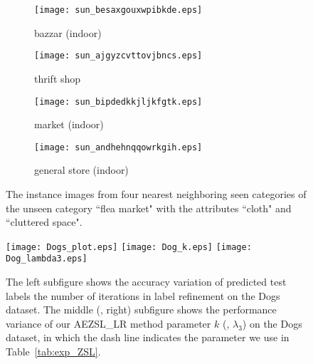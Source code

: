 \documentclass[journal]{IEEEtran}
\begin{document}
\setlength{\textfloatsep}{5pt}
\begin{figure*}[t]
        \centering
        \begin{subfigure}[b]{0.2985\textwidth}
                \texttt{[image: sun\_besaxgouxwpibkde.eps]}
				\caption{bazzar (indoor)}
        \end{subfigure}
        \begin{subfigure}[b]{0.1496\textwidth}
                \texttt{[image: sun\_ajgyzcvttovjbncs.eps]}
				\caption{thrift shop}
        \end{subfigure}
        \begin{subfigure}[b]{0.2660\textwidth}
                \texttt{[image: sun\_bipdedkkjljkfgtk.eps]}
				\caption{market (indoor)}
        \end{subfigure}
        \begin{subfigure}[b]{0.2660\textwidth}
                \texttt{[image: sun\_andhehnqqowrkgih.eps]}
				\caption{general store (indoor)}
        \end{subfigure}
        \caption{The instance images from four nearest neighboring seen categories of the unseen category ``flea market" with the attributes ``cloth" and ``cluttered space".}
        \label{fig:neighbors}
        \vspace{-10pt}
\end{figure*}


\setlength{\textfloatsep}{5pt}
\begin{figure*}[t]
        \centering
        \texttt{[image: Dogs\_plot.eps]}
		\texttt{[image: Dog\_k.eps]}
		\texttt{[image: Dog\_lambda3.eps]}     
        
        \caption{The left subfigure shows the accuracy variation of predicted test labels \wrt the number of iterations in label refinement on the Dogs dataset. The middle (\resp, right) subfigure shows the performance variance of our AEZSL\_LR method \wrt parameter $k$ (\resp, $\lambda_3$) on the Dogs dataset, in which the dash line indicates the parameter we use in Table~\ref{tab:exp_ZSL}.}
        \label{fig:progressive_refinement}
        \vspace{-10pt}
\end{figure*}
\end{document}
